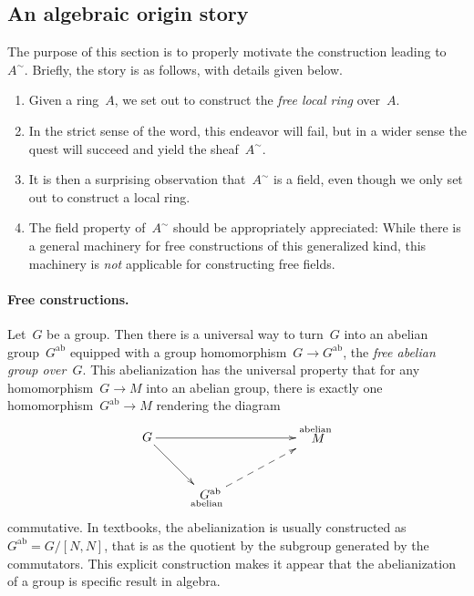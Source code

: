 \documentclass{ws-rv9x6}
\newcommand{\ab}{\mathrm{ab}}
\renewcommand{\_}{\mathpunct{.}}
\newcommand{\?}{\,{:}\,}
\begin{document}
\subsection{An algebraic origin story}
\label{sect:origins}

The purpose of this section is to properly motivate the construction
leading to~$A^\sim$. Briefly, the story is as follows, with details given
below.
\begin{enumerate}
\item Given a ring~$A$, we set out to construct the \emph{free local ring}
over~$A$.
\item In the strict sense of the word, this endeavor will fail, but in a wider
sense the quest will succeed and yield the sheaf~$A^\sim$.
\item It is then a surprising observation that~$A^\sim$ is a field, even though
we only set out to construct a local ring.
\item The field property of~$A^\sim$ should be appropriately appreciated: While
there is a general machinery for free constructions of this generalized kind, this
machinery is \emph{not} applicable for constructing free fields.
\end{enumerate}

\paragraph{Free constructions.}
Let~$G$ be a group. Then there is a universal way to turn~$G$ into an abelian
group~$G^\ab$ equipped with a group homomorphism~$G \to G^\ab$, the \emph{free
abelian group over~$G$}. This abelianization has the universal property that
for any homomorphism~$G \to M$ into an abelian group, there is exactly one
homomorphism~$G^\ab \to M$ rendering the diagram
\[ \xymatrix{
  G \ar[rd] \ar[rrr] &&& {\substack{\text{abelian}\\\text{\normalsize$\!M$}\\\phantom{\text{abelian}}}} \\
  & {\substack{\text{\normalsize$G^\ab$}\\\text{abelian}}} \ar@{-->}_[@!29]{}[rru]
} \]
commutative. In textbooks, the abelianization is usually constructed as~$G^\ab
= G/[N,N]$, that is as the quotient by the subgroup generated by the
commutators. This explicit construction makes it appear that the abelianization
of a group is specific result in algebra.
\end{document}
